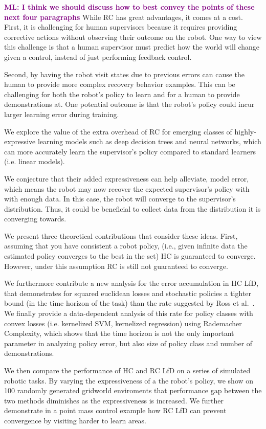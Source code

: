 \documentclass[10pt, conference]{ieeeconf}      %
\newcommand{\mlnote}[1]{\ifthenelse{ \boolean{include-notes}}%
 {\textcolor{purple}{\textbf{ML: #1}}}{}}
\begin{document}
\mlnote{I think we should discuss how to best convey the points of these next four paragraphs} While RC has great advantages, it comes at a cost. First, it is challenging for human supervisors because it requires providing corrective actions without observing their outcome on the robot. One way to view this challenge is that a human supervisor must  predict how the world will change given a control, instead of just performing feedback control. 

 Second, by having the robot visit states due to previous errors can cause the human to provide more complex recovery behavior examples. This can be challenging for both the robot's policy to learn and for a human to provide demonstrations at. One potential outcome is that the robot's policy could incur larger learning error during training. 

We explore the value of the extra overhead of RC for emerging classes of highly-expressive learning models such as deep decision trees and neural networks, which can more accurately learn the supervisor's policy compared to standard learners (i.e. linear models). 

We  conjecture that their added expressiveness can help alleviate, model error, which means the robot may now recover the expected supervisor's policy with with enough data. In this case, the robot will converge to the  supervisor's distribution. Thus,  it could be beneficial to collect data from the distribution it is converging towards. 

We present three theoretical contributions that consider these ideas. First, assuming that you have consistent a robot policy, (i.e., given infinite data the estimated policy converges to the best in the set) HC is guaranteed to converge. However,  under this assumption RC is still not guaranteed to converge. 

We furthermore contribute a new analysis for the error accumulation in HC LfD, that demonstrates for squared euclidean losses and stochastic policies a tighter bound (in the time horizon of the task) than the rate suggested by Ross et al.~\cite{ross2010efficient}. We finally provide a data-dependent analysis of this rate for policy classes with convex losses (i.e. kernelized SVM, kernelized regression) using Rademacher Complexity, which shows that the time horizon is not the only important parameter in analyzing policy error, but also size of policy class and number of demonstrations.

We then compare the performance of HC and RC LfD on a series of simulated robotic tasks. By varying the expressiveness of a the robot's policy, we show on 100 randomly generated gridworld enviroments that performance gap between the two methods diminishes as the expressiveness is increased. We further demonstrate in a point mass control example how RC LfD can prevent convergence by visiting harder to learn areas. 
\end{document}
